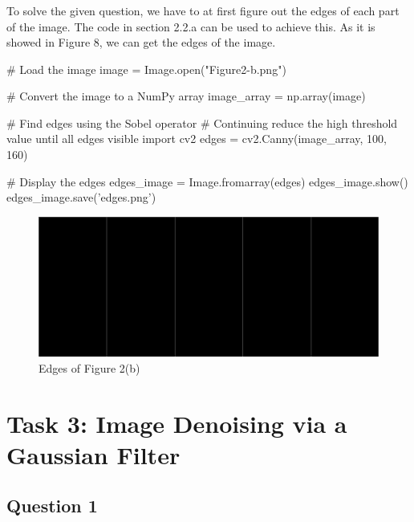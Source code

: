 \documentclass[12pt]{article}
\begin{document}
\subsubsection{}
\quad To solve the given question, we have to at first figure out the edges of each part of the image. The code in section 2.2.a can be used to achieve this. As it is showed in Figure 8, we can get the edges of the image.
\begin{python}
# Load the image
image = Image.open("Figure2-b.png")

# Convert the image to a NumPy array
image_array = np.array(image)

# Find edges using the Sobel operator
# Continuing reduce the high threshold value until all edges visible
import cv2
edges = cv2.Canny(image_array, 100, 160)

# Display the edges
edges_image = Image.fromarray(edges)
edges_image.show()
edges_image.save('edges.png')
  \end{python}

\begin{figure}[H]
  \centering
  \includegraphics[width=1.0\textwidth]{edges.png}
  \caption{Edges of Figure 2(b)}
  \label{fig:example}
\end{figure}

\section{Task 3: Image Denoising via a Gaussian Filter}

\subsection{Question 1}
\end{document}
